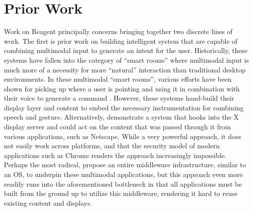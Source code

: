 \section{Prior Work}

Work on Reagent principally concerns bringing together two discrete lines
of work. The first is prior work on building intelligent system that are
capable of combining multimodal input to generate an intent for the user.
Historically, these systems have fallen into the category of ``smart rooms''
where multimodal input is much more of a necessity for more ``natural''
interaction than traditional desktop environments. In these multimodal
``smart rooms'', various efforts have been shown for picking up
where a user is pointing and using it in combination with
their voice to generate a command
\cite{bolt1980,carbini_wizard_2006,langner_multiple_2019,farrell_symbiotic_2016,kephart_embodied_2019}.
However, these systems hand-build their display layer and
content to embed the necessary instrumentation for combining speech
and gesture. Alternatively, \cite{coen_sodabot:_1994,brooks_intelligent_1997} demonstrate a system that
hooks into the X display server and could act on the content that was passed through
it from various applications, such as Netscape. While a very powerful approach, it
does not easily work across platforms, and that the security model of modern
applications such as Chrome renders the approach
increasingly impossible. Perhaps the most radical, \cite{roman_middleware_2002} propose an entire middleware infrastructure, similar to an OS,
to underpin these multimodal applications, but this approach
even more readily runs into the aforementioned bottleneck
in that all applications must be built from the ground up to 
utilize this middleware, rendering it hard to reuse existing
content and displays.

